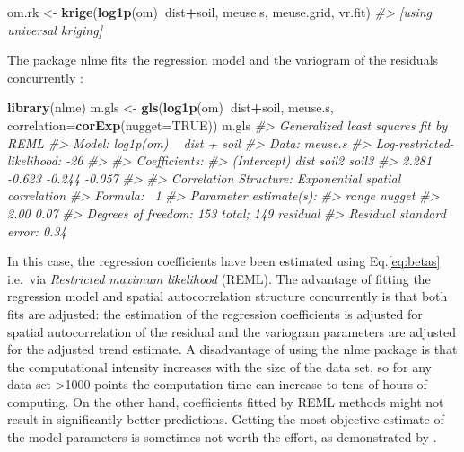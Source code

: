\documentclass[graybox,natbib,nospthms,UStrade]{svmono}
\newenvironment{Shaded}{\begin{snugshade}}{\end{snugshade}}
\newcommand{\CommentTok}[1]{\textcolor[rgb]{0.37,0.37,0.37}{\textit{#1}}}
\newcommand{\DataTypeTok}[1]{\textcolor[rgb]{0.27,0.27,0.27}{#1}}
\newcommand{\KeywordTok}[1]{\textcolor[rgb]{0.27,0.27,0.27}{\textbf{#1}}}
\newcommand{\NormalTok}[1]{#1}
\newcommand{\OperatorTok}[1]{\textcolor[rgb]{0.43,0.43,0.43}{\textbf{#1}}}
\newcommand{\OtherTok}[1]{\textcolor[rgb]{0.37,0.37,0.37}{#1}}
\newcommand{\StringTok}[1]{\textcolor[rgb]{0.5,0.5,0.5}{#1}}
\begin{document}
\begin{Shaded}
\begin{Highlighting}[]
\NormalTok{om.rk <-}\StringTok{ }\KeywordTok{krige}\NormalTok{(}\KeywordTok{log1p}\NormalTok{(om)}\OperatorTok{~}\NormalTok{dist}\OperatorTok{+}\NormalTok{soil, meuse.s, meuse.grid, vr.fit)}
\CommentTok{#> [using universal kriging]}
\end{Highlighting}
\end{Shaded}

The package nlme fits the regression model and the variogram of the residuals
concurrently \citep{pinheiro2009mixed}:

\begin{Shaded}
\begin{Highlighting}[]
\KeywordTok{library}\NormalTok{(nlme)}
\NormalTok{m.gls <-}\StringTok{ }\KeywordTok{gls}\NormalTok{(}\KeywordTok{log1p}\NormalTok{(om)}\OperatorTok{~}\NormalTok{dist}\OperatorTok{+}\NormalTok{soil, meuse.s, }\DataTypeTok{correlation=}\KeywordTok{corExp}\NormalTok{(}\DataTypeTok{nugget=}\OtherTok{TRUE}\NormalTok{))}
\NormalTok{m.gls}
\CommentTok{#> Generalized least squares fit by REML}
\CommentTok{#>   Model: log1p(om) ~ dist + soil }
\CommentTok{#>   Data: meuse.s }
\CommentTok{#>   Log-restricted-likelihood: -26}
\CommentTok{#> }
\CommentTok{#> Coefficients:}
\CommentTok{#> (Intercept)        dist       soil2       soil3 }
\CommentTok{#>       2.281      -0.623      -0.244      -0.057 }
\CommentTok{#> }
\CommentTok{#> Correlation Structure: Exponential spatial correlation}
\CommentTok{#>  Formula: ~1 }
\CommentTok{#>  Parameter estimate(s):}
\CommentTok{#>  range nugget }
\CommentTok{#>   2.00   0.07 }
\CommentTok{#> Degrees of freedom: 153 total; 149 residual}
\CommentTok{#> Residual standard error: 0.34}
\end{Highlighting}
\end{Shaded}

In this case, the regression coefficients have been estimated using
Eq.\eqref{eq:betas} i.e.~via \emph{Restricted maximum likelihood} (REML). The
advantage of fitting the regression model and spatial autocorrelation
structure concurrently is that both fits are adjusted: the estimation of the
regression coefficients is adjusted for spatial autocorrelation of the
residual and the variogram parameters are adjusted for the adjusted trend
estimate. A disadvantage of using the nlme package is that the computational
intensity increases with the size of the data set, so for any data
set \textgreater{}1000 points the computation time can increase to tens of hours
of computing. On the other hand, coefficients fitted by
REML methods might not result in significantly better predictions.
Getting the most objective estimate of the model parameters is sometimes
not worth the effort, as demonstrated by \citet{Minasny2007Geoderma}.
\end{document}
